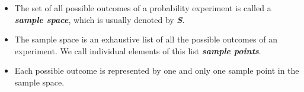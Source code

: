 \documentclass[12pt]{report}
\begin{document}
{ \Large
	
	\begin{itemize}
		\item The set of all possible outcomes of a probability experiment is called a
		\textbf{\emph{sample space}}, which is usually denoted by \textbf{\emph{S}}.
		\item The sample space is an exhaustive list of all the possible outcomes of an
		experiment. We call individual elements of this list \textbf{\emph{sample points}}.
		\item Each possible outcome is represented by one and only one sample point
		in the sample space.
	\end{itemize}
}
\end{document}
